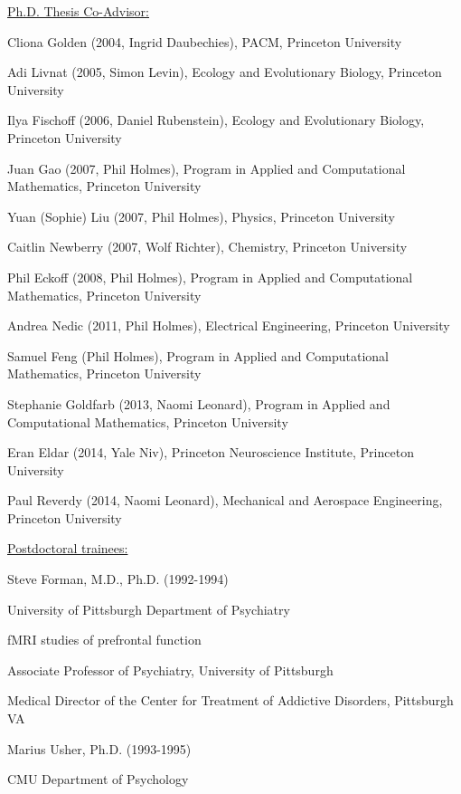\documentclass[10 pt]{article}
\begin{document}
{\fontsize{12pt}{16 pt}\selectfont \underline{Ph.D. Thesis Co-Advisor:}}
    \smallskip

Cliona Golden (2004, Ingrid Daubechies), PACM, Princeton University
    \smallskip

Adi Livnat (2005, Simon Levin), Ecology and Evolutionary Biology, Princeton University
    \smallskip

Ilya Fischoff (2006, Daniel Rubenstein), Ecology and Evolutionary Biology, Princeton University
    \smallskip

Juan Gao (2007, Phil Holmes), Program in Applied and Computational Mathematics, Princeton University
    \smallskip

Yuan (Sophie) Liu (2007, Phil Holmes), Physics, Princeton University
    \smallskip

Caitlin Newberry (2007, Wolf Richter), Chemistry, Princeton University
    \smallskip

Phil Eckoff (2008, Phil Holmes), Program in Applied and Computational Mathematics, Princeton University

Andrea Nedic (2011, Phil Holmes), Electrical Engineering, Princeton University
    \smallskip

Samuel Feng (Phil Holmes), Program in Applied and Computational Mathematics, Princeton University
    \smallskip

Stephanie Goldfarb (2013, Naomi Leonard), Program in Applied and Computational Mathematics, Princeton University
    \smallskip

Eran Eldar (2014, Yale Niv), Princeton Neuroscience Institute, Princeton University
    \smallskip

Paul Reverdy (2014, Naomi Leonard), Mechanical and Aerospace Engineering, Princeton University
    \bigskip


{\fontsize{13pt}{16 pt}\selectfont \underline{Postdoctoral trainees:}}
    \smallskip

Steve Forman, M.D., Ph.D. (1992-1994)

University of Pittsburgh Department of Psychiatry

fMRI studies of prefrontal function

Associate Professor of Psychiatry, University of Pittsburgh

Medical Director of the Center for Treatment of Addictive Disorders, Pittsburgh VA
    \medskip

Marius Usher, Ph.D. (1993-1995)

CMU Department of Psychology
\end{document}
